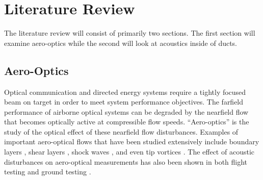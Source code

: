 
\chapter{Literature Review}
The literature review will consist of primarily two sections.
The first section will examine aero-optics while the second will look at acoustics inside of ducts.
\section{Aero-Optics}
Optical communication and directed energy systems require a tightly focused beam on target in order to meet system performance objectives.
The farfield performance of airborne optical systems can be degraded by the nearfield flow that becomes optically active at compressible flow speeds.
``Aero-optics'' is the study of the optical effect of these nearfield flow disturbances.
Examples of important aero-optical flows that have been studied extensively include boundary layers \cite{Gordeyev-2014-jcJndkHM,Smith-2013-VXArwwux,Wang-2012-gJ7rttg7}, shear layers \cite{Fitzgerald-2004-DgAgbreK,Rennie-2008-Wku6NheG}, shock waves \cite{Jumper-2013-8KtN3pue}, and even tip vortices \cite{Porter-2013-pQcNWHJ6}.
The effect of acoustic disturbances on aero-optical measurements has also been shown in both flight testing \cite{DeLucca-2018-gBQdjTmT} and ground testing \cite{Catron-2018-DdVp6VZf,Catron-2020-x8njYmmu}.

